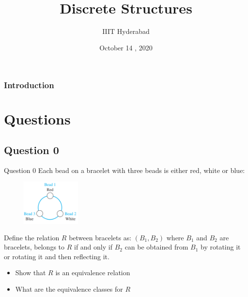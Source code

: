 \documentclass[xcolor=svgnames]{beamer}
\title[Discrete Structures]{Discrete Structures} %
\author{IIIT Hyderabad} %
\institute[] %
{
Monsoon 2020 \\ %
\medskip
\textit{Tutorial 8} %
}
\date{October 14    , 2020} %
\begin{document}
\begin{frame}
\titlepage %
\end{frame}

\begin{frame}
\frametitle{Introduction} %
\tableofcontents %
\end{frame}


\section{Questions}

\subsection{Question 0}

\begin{frame}{Question 0}
    Each bead on a bracelet with three beads is either red, white or blue:
    \begin{figure}
        \includegraphics[width=3cm]{dstut7q5.png}
        \label{fig:my_label}
    \end{figure}
    Define the relation $R$ between bracelets as: $(B_1, B_2)$ where $B_1$ and $B_2$ are bracelets, belongs to $R$ if and only if $B_2$ can be obtained from $B_1$ by rotating it or rotating it and then reflecting it. 
    \begin{itemize}
        \item Show that $R$ is an equivalence relation
        \item What are the equivalence classes for $R$
    \end{itemize}
\end{frame}
\end{document}
